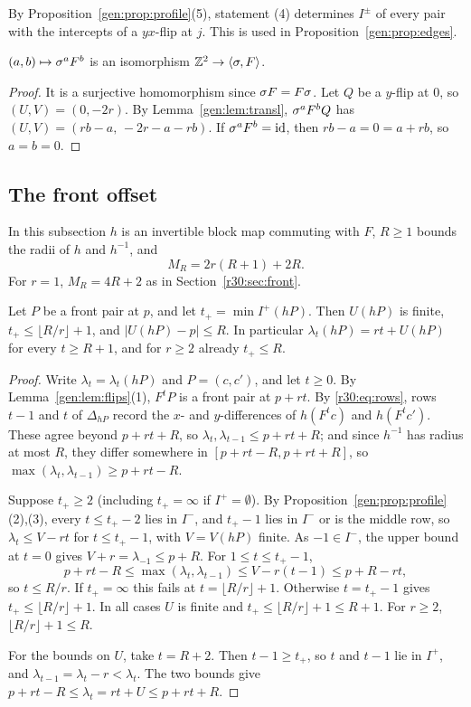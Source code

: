 By Proposition~\ref{gen:prop:profile}(5), statement (4) determines $I^\pm$ of every pair with the intercepts of a $yx$-flip at $j$. This is used in Proposition~\ref{gen:prop:edges}.

\begin{proposition}\label{gen:prop:Z2}
$(a,b)\mapsto\sigma^aF^b$ is an isomorphism $\mathbb{Z}^2\to\langle\sigma,F\rangle$.
\end{proposition}

\begin{proof}
It is a surjective homomorphism since $\sigma F=F\sigma$. Let $Q$ be a $y$-flip at $0$, so $(U,V)=(0,-2r)$. By Lemma~\ref{gen:lem:transl}, $\sigma^aF^bQ$ has $(U,V)=(rb-a,\,-2r-a-rb)$. If $\sigma^aF^b=\mathrm{id}$, then $rb-a=0=a+rb$, so $a=b=0$.
\end{proof}

\subsection{The front offset}\label{gen:sec:front}

In this subsection $h$ is an invertible block map commuting with $F$, $R\ge1$ bounds the radii of $h$ and $h^{-1}$, and
\[
M_R=2r(R+1)+2R .
\]
For $r=1$, $M_R=4R+2$ as in Section~\ref{r30:sec:front}.

\begin{lemma}[onset]\label{gen:lem:onset}
Let $P$ be a front pair at $p$, and let $t_+=\min I^+(hP)$. Then $U(hP)$ is finite, $t_+\le\lfloor R/r\rfloor+1$, and $|U(hP)-p|\le R$. In particular $\lambda_t(hP)=rt+U(hP)$ for every $t\ge R+1$, and for $r\ge2$ already $t_+\le R$.
\end{lemma}

\begin{proof}
Write $\lambda_t=\lambda_t(hP)$ and $P=(c,c')$, and let $t\ge0$. By Lemma~\ref{gen:lem:flips}(1), $F^tP$ is a front pair at $p+rt$. By \eqref{r30:eq:rows}, rows $t-1$ and $t$ of $\Delta_{hP}$ record the $x$- and $y$-differences of $h(F^tc)$ and $h(F^tc')$. These agree beyond $p+rt+R$, so $\lambda_t,\lambda_{t-1}\le p+rt+R$; and since $h^{-1}$ has radius at most $R$, they differ somewhere in $[p+rt-R,p+rt+R]$, so $\max(\lambda_t,\lambda_{t-1})\ge p+rt-R$.

Suppose $t_+\ge2$ (including $t_+=\infty$ if $I^+=\emptyset$). By Proposition~\ref{gen:prop:profile}(2),(3), every $t\le t_+-2$ lies in $I^-$, and $t_+-1$ lies in $I^-$ or is the middle row, so $\lambda_t\le V-rt$ for $t\le t_+-1$, with $V=V(hP)$ finite. As $-1\in I^-$, the upper bound at $t=0$ gives $V+r=\lambda_{-1}\le p+R$. For $1\le t\le t_+-1$,
\[
p+rt-R\le\max(\lambda_t,\lambda_{t-1})\le V-r(t-1)\le p+R-rt,
\]
so $t\le R/r$. If $t_+=\infty$ this fails at $t=\lfloor R/r\rfloor+1$. Otherwise $t=t_+-1$ gives $t_+\le\lfloor R/r\rfloor+1$. In all cases $U$ is finite and $t_+\le\lfloor R/r\rfloor+1\le R+1$. For $r\ge2$, $\lfloor R/r\rfloor+1\le R$.

For the bounds on $U$, take $t=R+2$. Then $t-1\ge t_+$, so $t$ and $t-1$ lie in $I^+$, and $\lambda_{t-1}=\lambda_t-r<\lambda_t$. The two bounds give $p+rt-R\le\lambda_t=rt+U\le p+rt+R$.
\end{proof}

